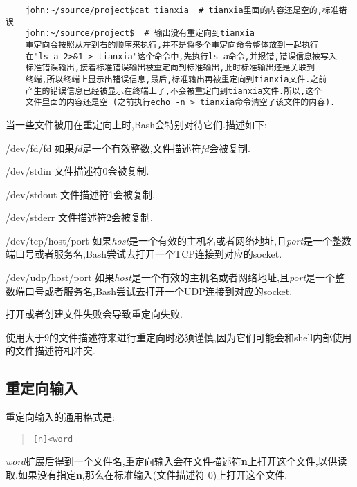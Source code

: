 \documentclass[draft,openany]{book}
\begin{document}
\begin{CJK}{UTF8}{gbsn}
\begin{verbatim}
    john:~/source/project$cat tianxia  # tianxia里面的内容还是空的,标准错误
    john:~/source/project$  # 输出没有重定向到tianxia
    重定向会按照从左到右的顺序来执行,并不是将多个重定向命令整体放到一起执行
    在"ls a 2>&1 > tianxia"这个命令中,先执行ls a命令,并报错,错误信息被写入
    标准错误输出,接着标准错误输出被重定向到标准输出,此时标准输出还是关联到
    终端,所以终端上显示出错误信息,最后,标准输出再被重定向到tianxia文件.之前
    产生的错误信息已经被显示在终端上了,不会被重定向到tianxia文件.所以,这个
    文件里面的内容还是空 (之前执行echo -n > tianxia命令清空了该文件的内容).
    \end{verbatim}
    当一些文件被用在重定向上时,Bash会特别对待它们.描述如下:
    \begin{basedescript}{\desclabelstyle{\nextlinelabel}\desclabelwidth{2.5em}}
    \item[/dev/fd/fd] 如果\emph{fd}是一个有效整数,文件描述符\emph{fd}会被复制.
    \item[/dev/stdin] 文件描述符0会被复制.
    \item[/dev/stdout] 文件描述符1会被复制.
    \item[/dev/stderr] 文件描述符2会被复制.
    \item[/dev/tcp/host/port] 如果\emph{host}是一个有效的主机名或者网络地址,且\emph{port}是一个整数端口号或者服务名,Bash尝试去打开一个TCP连接到对应的socket.
    \item[/dev/udp/host/port] 如果\emph{host}是一个有效的主机名或者网络地址,且\emph{port}是一个整数端口号或者服务名,Bash尝试去打开一个UDP连接到对应的socket.
    \end{basedescript}
    打开或者创建文件失败会导致重定向失败.\par
    使用大于9的文件描述符来进行重定向时必须谨慎,因为它们可能会和shell内部使用的文件描述符相冲突.

    \subsection{重定向输入}
    重定向输入的通用格式是:
    \begin{quote}
        \verb+[n]<word+
    \end{quote}
    \emph{word}扩展后得到一个文件名,重定向输入会在文件描述符\textbf{n}上打开这个文件,以供读取.如果没有指定\textbf{n},那么在标准输入(文件描述符 0)上打开这个文件.


\end{CJK}
\end{document}
